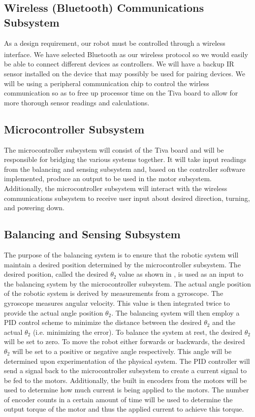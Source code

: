 \documentclass[11pt]{report}
\begin{document}
\begin{spacing}{1.5}
\subsection*{Wireless (Bluetooth\textsuperscript{\textregistered}) Communications Subsystem}

As a design requirement, our robot must be controlled through a wireless interface.  We have selected Bluetooth\textsuperscript{\textregistered} as our wireless protocol so we would easily be able to connect different devices as controllers.  We will have a backup IR sensor installed on the device that may possibly be used for pairing devices.  We will be using a peripheral communication chip to control the wirless communication so as to free up processor time on the Tiva board to allow for more thorough sensor readings and calculations.

\subsection*{Microcontroller Subsystem}

The microcontroller subsystem will consist of the Tiva board and will be responsible for bridging the various systems together. It will take input readings from the balancing and sensing subsystem and, based on the controller software implemented, produce an output to be used in the motor subsystem. Additionally, the microcontroller subsystem will interact with the wireless communications subsystem to receive user input about desired direction, turning, and powering down.

\subsection*{Balancing and Sensing Subsystem}

The purpose of the balancing system is to ensure that the robotic system will maintain a desired position determined by the microcontroller subsystem.  The desired position, called the desired $\theta_2$ value as shown in \cite{Groff}, is used as an input to the balancing system by the microcontroller subsystem.   The actual angle position of the robotic system is derived by measurements from a gyroscope.  The gyroscope measures angular velocity.  This value is then integrated twice to provide the actual angle position $\theta_2$.   The balancing system will then employ a PID control scheme to minimize the distance between the desired $\theta_2$ and the actual $\theta_2$ (i.e. minimizing the error).  To balance the system at rest, the desired $\theta_2$ will be set to zero.  To move the robot either forwards or backwards, the desired $\theta_2$ will be set to a positive or negative angle respectively.  This angle will be determined upon experimentation of the physical system.   The PID controller will send a signal back to the microcontroller subsystem to create a current signal to be fed to the motors.  Additionally, the built in encoders from the motors will be used to determine how much current is being applied to the motors.  The number of encoder counts in a certain amount of time will be used to determine the output torque of the motor and thus the applied current to achieve this torque.


\end{spacing}
\end{document}

